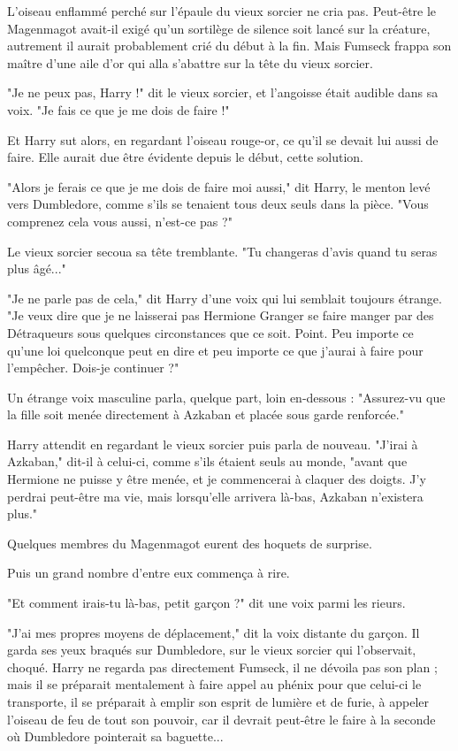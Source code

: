 L'oiseau enflammé perché sur l'épaule du vieux sorcier ne cria pas. Peut-être le Magenmagot avait-il exigé qu'un sortilège de silence soit lancé sur la créature, autrement il aurait probablement crié du début à la fin. Mais Fumseck frappa son maître d'une aile d'or qui alla s'abattre sur la tête du vieux sorcier.

"Je ne peux pas, Harry !" dit le vieux sorcier, et l'angoisse était audible dans sa voix. "Je fais ce que je me dois de faire !"

Et Harry sut alors, en regardant l'oiseau rouge-or, ce qu'il se devait lui aussi de faire. Elle aurait due être évidente depuis le début, cette solution.

"Alors je ferais ce que je me dois de faire moi aussi," dit Harry, le menton levé vers Dumbledore, comme s'ils se tenaient tous deux seuls dans la pièce. "Vous comprenez cela vous aussi, n'est-ce pas ?"

Le vieux sorcier secoua sa tête tremblante. "Tu changeras d'avis quand tu seras plus âgé..."

"Je ne parle pas de cela," dit Harry d'une voix qui lui semblait toujours étrange. "Je veux dire que je ne laisserai pas Hermione Granger se faire manger par des Détraqueurs sous quelques circonstances que ce soit. Point. Peu importe ce qu'une loi quelconque peut en dire et peu importe ce que j'aurai à faire pour l'empêcher. Dois-je continuer ?"

Un étrange voix masculine parla, quelque part, loin en-dessous : "Assurez-vu que la fille soit menée directement à Azkaban et placée sous garde renforcée."

Harry attendit en regardant le vieux sorcier puis parla de nouveau. "J'irai à Azkaban," dit-il à celui-ci, comme s'ils étaient seuls au monde, "avant que Hermione ne puisse y être menée, et je commencerai à claquer des doigts. J'y perdrai peut-être ma vie, mais lorsqu'elle arrivera là-bas, Azkaban n'existera plus."

Quelques membres du Magenmagot eurent des hoquets de surprise.

Puis un grand nombre d'entre eux commença à rire.

"Et comment irais-tu là-bas, petit garçon ?" dit une voix parmi les rieurs.

"J'ai mes propres moyens de déplacement," dit la voix distante du garçon. Il garda ses yeux braqués sur Dumbledore, sur le vieux sorcier qui l'observait, choqué. Harry ne regarda pas directement Fumseck, il ne dévoila pas son plan ; mais il se préparait mentalement à faire appel au phénix pour que celui-ci le transporte, il se préparait à emplir son esprit de lumière et de furie, à appeler l'oiseau de feu de tout son pouvoir, car il devrait peut-être le faire à la seconde où Dumbledore pointerait sa baguette...

